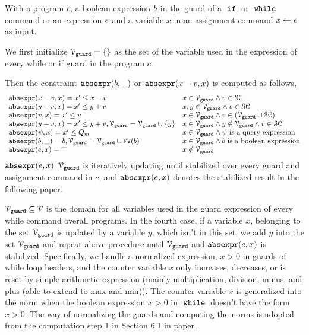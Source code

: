 \begin{defn}
 \label{def:constraint_compute}
 With a program $c$, a boolean expression $b$ in the guard of a $\;\mathtt{if}\;$ or $\;\mathtt{while}\;$ command
 or an expression $e$ and a variable $x$
 in an assignment command $\mathrel{ x \leftarrow e }$ as input.

 We first initialize 
 $\mathcal{V}_{\mathtt{guard}} = \{\}$ as the set of the variable used in the expression of every while or if guard in the program $c$.

 Then the constraint $\mathtt{abs}{\mathtt{expr}}(b, \_)$ or $\mathtt{abs}{\mathtt{expr}}(x - v, x)$ is computed as follows,
 \[
 \begin{array}{ll} 
 \mathtt{abs}{\mathtt{expr}}(x - v, x) = x' \leq x - v & x \in \mathcal{V}_{\mathtt{guard}} \land v \in \mathcal{SC} \\
 \mathtt{abs}{\mathtt{expr}}(y + v, x) = x' \leq y + v & x, y \in \mathcal{V}_{\mathtt{guard}} \land v \in \mathcal{SC} \\
 \mathtt{abs}{\mathtt{expr}}(v, x) = x' \leq v & x \in \mathcal{V}_{\mathtt{guard}} \land v \in (\mathcal{V}_{\mathtt{guard}} \cup \mathcal{SC}) \\
 \mathtt{abs}{\mathtt{expr}}(y + v, x) = x' \leq y + v, 
 \mathcal{V}_{\mathtt{guard}} = \mathcal{V}_{\mathtt{guard}} \cup \{y\} & x \in \mathcal{V}_{\mathtt{guard}} \land y \notin \mathcal{V}_{\mathtt{guard}} \land v \in \mathcal{SC} \\
 \mathtt{abs}{\mathtt{expr}}(\psi, x) = x' \leq Q_m & x \in \mathcal{V}_{\mathtt{guard}} \land \psi \text{ is a query expression} \\
 \mathtt{abs}{\mathtt{expr}}(b, \_) = b, \mathcal{V}_{\mathtt{guard}} = \mathcal{V}_{\mathtt{guard}} \cup 
 \mathtt{FV}(b) & x \in \mathcal{V}_{\mathtt{guard}} \land b \text{ is a boolean expression} \\
 \mathtt{abs}{\mathtt{expr}}(e, x) = \top & x \notin \mathcal{V}_{\mathtt{guard}} \\
 \end{array}
 \]
 $\mathtt{abs}{\mathtt{expr}}(e, x)$ $\mathcal{V}_{\mathtt{guard}}$ is iteratively updating until stabilized over every guard and assignment command in $c$, and $\mathtt{abs}{\mathtt{expr}}(e, x)$
 denotes the stabilized result in the following paper.
 \end{defn}
%
$\mathcal{V}_{\mathtt{guard}} \subseteq \mathcal{V}$ is the domain for all variables used in the guard expression of every while command overall programs. 
In the fourth case, if a variable $x$, belonging to the set 
$\mathcal{V}_{\mathtt{guard}}$ is updated by a variable $y$, which isn't in this set, 
we add $y$ into the set $\mathcal{V}_{\mathtt{guard}}$ and repeat 
above procedure until $\mathcal{V}_{\mathtt{guard}}$ and $\mathtt{abs}{\mathtt{expr}}(e, x)$ is stabilized. 
Specifically,
we handle a normalized expression, $x > 0$
in guards of while loop headers, and 
the counter variable $x$ only increases, decreases, or is reset by 
simple arithmetic expression (mainly multiplication, division, minus, and plus (able to extend to max and min)). 
The counter variable $x$ is generalized into the norm when the boolean expression $x > 0$
in $\;\mathtt{while}\;$ doesn't have the form $x > 0$.
The way of normalizing the guards and computing the norms is adopted from the computation step 1 in Section 6.1 in paper \cite{SinnZV17}. 

